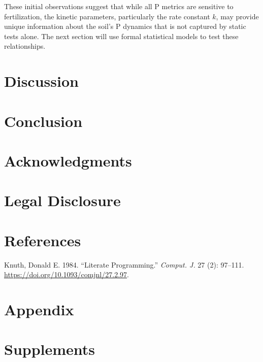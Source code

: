 \documentclass[
  a4paper,
]{article}
\newlength{\cslhangindent}
\newenvironment{CSLReferences}[2] %
 {\begin{list}{}{%
  \setlength{\itemindent}{0pt}
  \setlength{\leftmargin}{0pt}
  \setlength{\parsep}{0pt}
  \ifodd #1
   \setlength{\leftmargin}{\cslhangindent}
   \setlength{\itemindent}{-1\cslhangindent}
  \fi
  \setlength{\itemsep}{#2\baselineskip}}}
 {\end{list}}
\begin{document}
These initial observations suggest that while all P metrics are
sensitive to fertilization, the kinetic parameters, particularly the
rate constant \(k\), may provide unique information about the soil's P
dynamics that is not captured by static tests alone. The next section
will use formal statistical models to test these relationships.

\section{Discussion}\label{discussion}

\section{Conclusion}\label{conclusion}

\section{Acknowledgments}\label{acknowledgments}

\section{Legal Disclosure}\label{legal-disclosure}

\section*{References}\label{references}

\label{refs}
\begin{CSLReferences}{1}{0}
Knuth, Donald E. 1984. {``Literate Programming.''} \emph{Comput. J.} 27
(2): 97--111. \url{https://doi.org/10.1093/comjnl/27.2.97}.

\end{CSLReferences}

\section{Appendix}\label{appendix}

\section{Supplements}\label{supplements}
\end{document}
